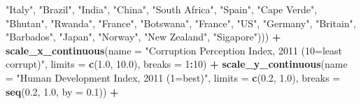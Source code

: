 \documentclass[]{book}
\newenvironment{Shaded}{\begin{snugshade}}{\end{snugshade}}
\newcommand{\KeywordTok}[1]{\textcolor[rgb]{0.13,0.29,0.53}{\textbf{#1}}}
\newcommand{\DataTypeTok}[1]{\textcolor[rgb]{0.13,0.29,0.53}{#1}}
\newcommand{\DecValTok}[1]{\textcolor[rgb]{0.00,0.00,0.81}{#1}}
\newcommand{\FloatTok}[1]{\textcolor[rgb]{0.00,0.00,0.81}{#1}}
\newcommand{\StringTok}[1]{\textcolor[rgb]{0.31,0.60,0.02}{#1}}
\newcommand{\OperatorTok}[1]{\textcolor[rgb]{0.81,0.36,0.00}{\textbf{#1}}}
\newcommand{\NormalTok}[1]{#1}
\begin{document}
\begin{Shaded}
\begin{Highlighting}[]
{                                                           \StringTok{"Italy"}\NormalTok{,}
                                                           \StringTok{"Brazil"}\NormalTok{,}
                                                           \StringTok{"India"}\NormalTok{,}
                                                           \StringTok{"China"}\NormalTok{,}
                                                           \StringTok{"South Africa"}\NormalTok{,}
                                                           \StringTok{"Spain"}\NormalTok{,}
                                                           \StringTok{"Cape Verde"}\NormalTok{,}
                                                           \StringTok{"Bhutan"}\NormalTok{,}
                                                           \StringTok{"Rwanda"}\NormalTok{,}
                                                           \StringTok{"France"}\NormalTok{,}
                                                           \StringTok{"Botswana"}\NormalTok{,}
                                                           \StringTok{"France"}\NormalTok{,}
                                                           \StringTok{"US"}\NormalTok{,}
                                                           \StringTok{"Germany"}\NormalTok{,}
                                                           \StringTok{"Britain"}\NormalTok{,}
                                                           \StringTok{"Barbados"}\NormalTok{,}
                                                           \StringTok{"Japan"}\NormalTok{,}
                                                           \StringTok{"Norway"}\NormalTok{,}
                                                           \StringTok{"New Zealand"}\NormalTok{,}
                                                           \StringTok{"Sigapore"}\NormalTok{))) }\OperatorTok{+}
\StringTok{  }\KeywordTok{scale_x_continuous}\NormalTok{(}\DataTypeTok{name =} \StringTok{"Corruption Perception Index, 2011 (10=least corrupt)"}\NormalTok{,}
                     \DataTypeTok{limits =} \KeywordTok{c}\NormalTok{(}\FloatTok{1.0}\NormalTok{, }\FloatTok{10.0}\NormalTok{),}
                     \DataTypeTok{breaks =} \DecValTok{1}\OperatorTok{:}\DecValTok{10}\NormalTok{) }\OperatorTok{+}
\StringTok{  }\KeywordTok{scale_y_continuous}\NormalTok{(}\DataTypeTok{name =} \StringTok{"Human Development Index, 2011 (1=best)"}\NormalTok{,}
                     \DataTypeTok{limits =} \KeywordTok{c}\NormalTok{(}\FloatTok{0.2}\NormalTok{, }\FloatTok{1.0}\NormalTok{),}
                     \DataTypeTok{breaks =} \KeywordTok{seq}\NormalTok{(}\FloatTok{0.2}\NormalTok{, }\FloatTok{1.0}\NormalTok{, }\DataTypeTok{by =} \FloatTok{0.1}\NormalTok{)) }\OperatorTok{+}
}
\end{Highlighting}
\end{Shaded}
\end{document}
